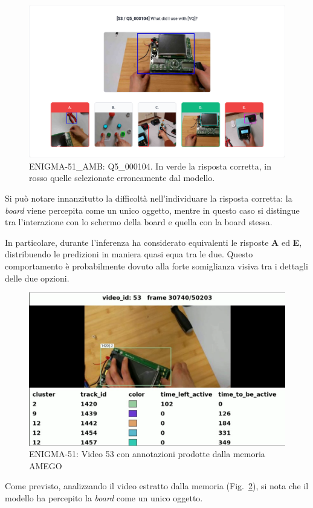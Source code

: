 \begin{figure}[h!]
    \centering
    \includegraphics[width=0.7\linewidth]{Images/amego_error_res-ANS.png}
    \caption{
        ENIGMA-51\_AMB: Q5\_000104. In verde la risposta corretta, in rosso quelle selezionate erroneamente dal modello.
    }
    \label{fig:amego_error_ans}
\end{figure}

Si può notare innanzitutto la difficoltà nell'individuare la risposta corretta: la \emph{board} viene percepita come un unico oggetto, mentre in questo caso si distingue tra l'interazione con lo schermo della board e quella con la board stessa.

In particolare, durante l'inferenza ha considerato equivalenti le risposte \textbf{A} ed \textbf{E}, distribuendo le predizioni in maniera quasi equa tra le due. Questo comportamento è probabilmente dovuto alla forte somiglianza visiva tra i dettagli delle due opzioni.

\begin{figure}[h!]
    \centering
    \includegraphics[width=0.6\linewidth]{Images/amego_error_res-VIDEO.png}
    \caption{
        ENIGMA-51: Video 53 con annotazioni prodotte dalla memoria AMEGO
    }
    \label{fig:amego_error_video}
\end{figure}

Come previsto, analizzando il video estratto dalla memoria (Fig.~\ref{fig:amego_error_video}), si nota che il modello ha percepito la \emph{board} come un unico oggetto.